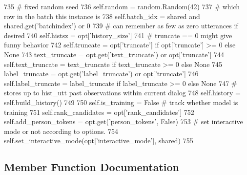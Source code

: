 \begin{DoxyCode}
735         \textcolor{comment}{# fixed random seed}
736         self.random = random.Random(42)
737         \textcolor{comment}{# which row in the batch this instance is}
738         self.batch\_idx = shared \textcolor{keywordflow}{and} shared.get(\textcolor{stringliteral}{'batchindex'}) \textcolor{keywordflow}{or} 0
739         \textcolor{comment}{# can remember as few as zero utterances if desired}
740         self.histsz = opt[\textcolor{stringliteral}{'history\_size'}]
741         \textcolor{comment}{# truncate == 0 might give funny behavior}
742         self.truncate = opt[\textcolor{stringliteral}{'truncate'}] \textcolor{keywordflow}{if} opt[\textcolor{stringliteral}{'truncate'}] >= 0 \textcolor{keywordflow}{else} \textcolor{keywordtype}{None}
743         text\_truncate = opt.get(\textcolor{stringliteral}{'text\_truncate'}) \textcolor{keywordflow}{or} opt[\textcolor{stringliteral}{'truncate'}]
744         self.text\_truncate = text\_truncate \textcolor{keywordflow}{if} text\_truncate >= 0 \textcolor{keywordflow}{else} \textcolor{keywordtype}{None}
745         label\_truncate = opt.get(\textcolor{stringliteral}{'label\_truncate'}) \textcolor{keywordflow}{or} opt[\textcolor{stringliteral}{'truncate'}]
746         self.label\_truncate = label\_truncate \textcolor{keywordflow}{if} label\_truncate >= 0 \textcolor{keywordflow}{else} \textcolor{keywordtype}{None}
747         \textcolor{comment}{# stores up to hist\_utt past observations within current dialog}
748         self.history = self.build\_history()
749 
750         self.is\_training = \textcolor{keyword}{False}  \textcolor{comment}{# track whether model is training}
751         self.rank\_candidates = opt[\textcolor{stringliteral}{'rank\_candidates'}]
752         self.add\_person\_tokens = opt.get(\textcolor{stringliteral}{'person\_tokens'}, \textcolor{keyword}{False})
753         \textcolor{comment}{# set interactive mode or not according to options.}
754         self.set\_interactive\_mode(opt[\textcolor{stringliteral}{'interactive\_mode'}], shared)
755 
\end{DoxyCode}


\subsection{Member Function Documentation}
\mbox{\label{classparlai_1_1core_1_1torch__agent_1_1TorchAgent_a51174dfa508970e3392246b02d0d94b5}} 
